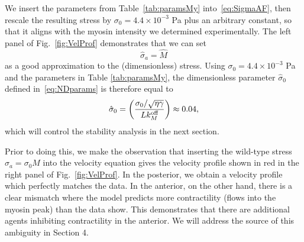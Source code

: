 \documentclass[11pt]{article}
\newcommand{\6}[1]{#1_{\text{6}}}
\newcommand{\3}[1]{#1_{\text{3}}}
\newcommand{\My}[1]{#1_M}
\begin{document}
We insert the parameters from Table\ \ref{tab:paramsMy} into\ \eqref{eq:SigmaAF}, then rescale the resulting stress by $\sigma_0=4.4 \times 10^{-3}$ Pa plus an arbitrary constant, so that it aligns with the myosin intensity we determined experimentally. The left panel of Fig.\ \ref{fig:VelProf} demonstrates that we can set 
\begin{equation}
\hat \sigma_a=\hat M
\end{equation}
as a good approximation to the (dimensionless) stress. Using $\sigma_0=4.4 \times 10^{-3}$ Pa and the parameters in Table \ref{tab:paramsMy}, the dimensionless parameter $\hat{\sigma}_0$ defined in\ \eqref{eq:NDparams} is therefore equal to
\begin{equation}
\hat{\sigma}_0 = \left(\frac{\sigma_0/ \sqrt{\eta \gamma} }{L \My{\koff}}\right)  \approx 0.04,
\end{equation}
which will control the stability analysis in the next section. 

Prior to doing this, we make the observation that inserting the wild-type stress $\sigma_a=\sigma_0 M$ into the velocity equation gives the velocity profile shown in red in the right panel of Fig.\ \ref{fig:VelProf}. In the posterior, we obtain a velocity profile which perfectly matches the data. In the anterior, on the other hand, there is a clear mismatch where the model predicts more contractility (flows into the myosin peak) than the data show. This demonstrates that there are additional agents inhibiting contractility in the anterior. We will address the source of this ambiguity in Section 4. 
\end{document}

